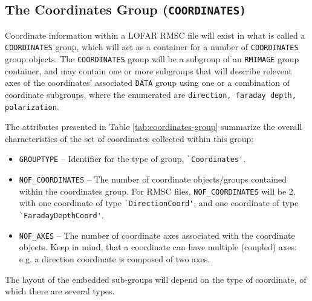 \documentclass[a4paper,10pt,bibtotoc]{scrartcl}
\begin{document}
\subsection{The Coordinates Group (\tt COORDINATES)}
\label{sec:coordinates group}

Coordinate information within a LOFAR RMSC file will exist in what is called a \texttt{COORDINATES} group, which will act as a container for a number of \texttt{COORDINATES} group objects.  The \texttt{COORDINATES} group will be a subgroup of an \texttt{RMIMAGE} group container, and may contain one or more subgroups that will describe relevent axes of the coordinates' associated \texttt{DATA} group using one or a combination of coordinate subgroups, where the enumerated are \texttt{direction, faraday depth, polarization}.



The attributes presented in Table \ref{tab:coordinates-group} summarize the overall characteristics of the set of coordinates collected within this group:
\begin{itemize}
    \item \verb|GROUPTYPE| -- Identifier for the type of group, \verb|`Coordinates'|.
    \item \verb|NOF_COORDINATES| -- The number of coordinate objects/groups contained within the coordinates group.  For RMSC files, \verb|NOF_COORDINATES| will be 2, with one coordinate of type \verb|`DirectionCoord'|, and one coordinate of type \verb|`FaradayDepthCoord'|.
    \item \verb|NOF_AXES| -- The number of coordinate axes associated with the coordinate objects. Keep in mind, that a coordinate can have multiple (coupled) axes:  e.g. a direction coordinate is composed of two axes.
\end{itemize}

The layout of the embedded sub-groups will depend on the type of coordinate, of which there are several types.

\end{document}
